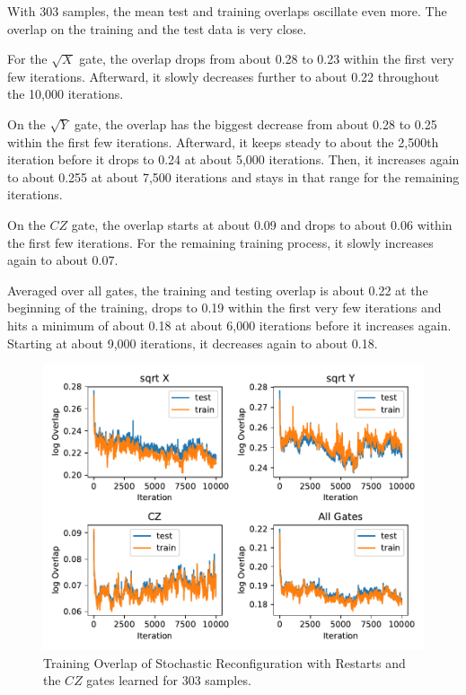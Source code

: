 With 303 samples, the mean test and training overlaps oscillate even more. The overlap on the training and the 
test data is very close. 

For the $\sqrt{X}$ gate, the overlap drops from about 0.28 to 0.23 within the first very few iterations. 
Afterward, it slowly decreases further to about 0.22 throughout the 10,000 iterations.

On the $\sqrt{Y}$ gate, the overlap has the biggest decrease from about 0.28 to 0.25 within the first 
few iterations. Afterward, it keeps steady to about the 2,500th iteration before it drops to 0.24 at about 5,000 iterations.
Then, it increases again to about 0.255 at about 7,500 iterations and stays in that range for the remaining iterations.

On the $CZ$ gate, the overlap starts at about 0.09 and drops to about 0.06 within the first few iterations. 
For the remaining training process, it slowly increases again to about 0.07. 

Averaged over all gates, the training and testing overlap is about 0.22 at the beginning of the training, 
drops to 0.19 within the first very few iterations and hits a minimum of about 0.18 at about 6,000 iterations before 
it increases again. Starting at about 9,000 iterations, it decreases again to about 0.18.

\begin{figure}[H]
  \centering
  \includegraphics[width=\textwidth]{figures/results/SR-restarts-learned/avgOverlap_303.pdf}
  \caption[Training Overlap of Stochastic Reconfiguration with Restarts Learned]{Training 
  Overlap of Stochastic Reconfiguration with Restarts and the $CZ$ gates learned for 303 samples.}
  \label{fig:sr_restarts_overlap_303}
\end{figure}

